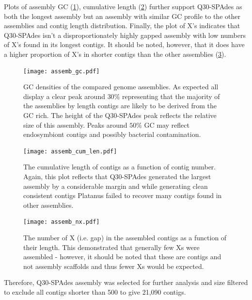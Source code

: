 Plots of assembly GC (\cref{fig:assemb_gc}), cumulative length (\cref{fig:assemb_len})
further support Q30-SPAdes as both the longest assembly
but an assembly with similar GC profile to the other assemblies and contig length distribution.
Finally, the plot of X's indicates that Q30-SPAdes isn't a disproportionately highly gapped
assembly with low numbers of X's found in its longest contigs.  It should be noted, however,
that it does have a higher proportion of X's in shorter contigs than the other
assemblies (\cref{fig:assemb_nx}).

\begin{figure}
    \centering
    \texttt{[image: assemb\_gc.pdf]}
    \caption[Comparative genome assembly GC densities]{GC densities of the compared genome assemblies.  As expected
        all display a clear peak around \(30\%\) representing that the majority
    of the assemblies by length contigs are likely to be derived from the GC rich.
The height of the Q30-SPAdes peak reflects the relative size of this assembly.
Peaks around \(50\%\) GC may reflect endosymbiont contigs and possibly
bacterial contamination.}
    \label{fig:assemb_gc}
\end{figure}

\begin{figure}
    \centering
    \texttt{[image: assemb\_cum\_len.pdf]}
    \caption[Comparative cumulative contig lengths of genome assemblies]{The cumulative length of contigs as a function of
        contig number.  Again, this plot reflects
        that Q30-SPAdes generated the largest assembly
        by a considerable margin and while generating
        clean consistent contigs Platanus failed to recover
    many contigs found in other assemblies.}
    \label{fig:assemb_len}
\end{figure}

\begin{figure}
    \centering
    \texttt{[image: assemb\_nx.pdf]}
    \caption[Comparative genome assembly gaps]{The number of X (i.e. gap) in the assembled contigs as a function of their
        length.  This demonstrated that generally few Xs were assembled - however, it should 
        be noted that these are contigs and not assembly scaffolds and thus fewer Xs
    would be expected.}
    \label{fig:assemb_nx}
\end{figure}

Therefore, Q30-SPAdes assembly was selected for further analysis
and size filtered to exclude all contigs shorter than \SI{500}{\bp} 
to give 21,090 contigs. 

